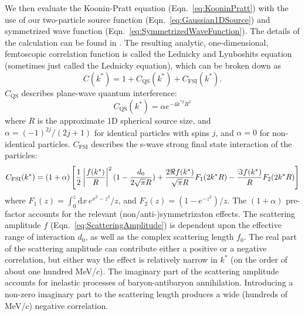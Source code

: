 We then evaluate the Koonin-Pratt equation (Eqn.\ \ref{eq:KooninPratt}) with the use of our two-particle source function (Eqn.\ \ref{eq:Gaussian1DSource}) and symmetrized wave function (Eqn.\ \ref{eq:SymmetrizedWaveFunction}).
The details of the calculation can be found in \cite{lednicky82}.
The resulting analytic, one-dimensional, femtoscopic correlation function is called the Lednicky and Lyuboshits equation (sometimes just called the Lednicky equation), which can be broken down as
\begin{equation}
\label{eq:GeneralCorrelationFunction}
C(k^*)= 1 + C_{\mathrm{QS}}(k^*)+C_{\mathrm{FSI}}(k^*).
\end{equation}
$C_{\mathrm{QS}}$ describes plane-wave quantum interference:
\begin{equation}
C_{\mathrm{QS}}(k^*) = \alpha e^{-4k^{*2}R^2}
\end{equation}
where $R$ is the approximate 1D spherical source size, and $\alpha = (-1)^{2j}/(2j+1)$ for identical particles with spins $j$, and $\alpha = 0$ for non-identical particles.
$C_{\mathrm{FSI}}$ describes the s-wave strong final state interaction of the particles:
\begin{equation}
\label{eq:Lednicky}
C_{\mathrm{FSI}}(k^*)= (1+\alpha)\left[\frac{1}{2}\left\lvert\frac{f(k^*)}{R}\right\rvert^2(1-\frac{d_0}{2\sqrt{\pi}R})+\frac{2\Re f(k^*)}{\sqrt{\pi}R}F_1(2k^*R)-\frac{\Im f(k^*)}{R}F_2(2k^*R)\right]
\end{equation}
where $F_1(z) = \int_0^z \! \mathrm{d}x \, e^{x^2-z^2}/z$, and $F_2(z) = (1-e^{-z^2})/z$.
The $(1+\alpha)$ pre-factor accounts for the relevant (non/anti-)symmetrizaton effects.
The scattering amplitude $f$ (Eqn.\ \ref{eq:ScatteringAmplitude}) is dependent upon the effective range of interaction $d_0$, as well as the complex scattering length $f_0$.  
The real part of the scattering amplitude can contribute either a positive or a negative correlation, but either way the effect is relatively narrow in $k^*$ (on the order of about one hundred MeV/$c$).  
The imaginary part of the scattering amplitude accounts for inelastic processes of baryon-antibaryon annihilation.  
Introducing a non-zero imaginary part to the scattering length produces a wide (hundreds of MeV/$c$) negative correlation.  

